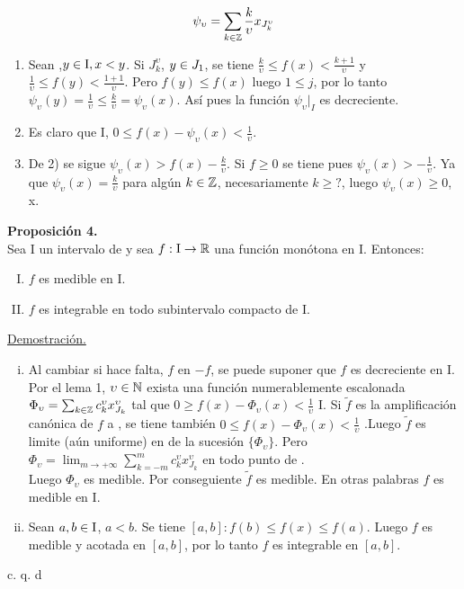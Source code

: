 \begin{equation*}
\psi_\upsilon= \sum_{k \in \mathbb{Z}} \frac{k}{\upsilon} x_{J_k^\upsilon}
\end{equation*}
\begin{enumerate}[1)]
\item Sean \x ,$y \in \mathrm{I}, x < y$. Si \x \en $J_k^\upsilon$, $y \in J_1$, se tiene $\frac{k}{\upsilon} \leq f(x) < \frac{k+1}{\upsilon}$ y $\frac{1}{\upsilon} \leq f(y) < \frac{1+1}{\upsilon}$. Pero $f(y) \leq f(x)$ luego $1 \leq j$, por lo tanto $\psi_\upsilon(y)= \frac{1}{\upsilon} \leq \frac{k}{\upsilon}=\psi_\upsilon (x)$. Así pues la función $\psi_\upsilon |_I$ es decreciente.
\item Es claro que \todo \phantom{} \x \en $\mathrm{I}$, $0 \leq f(x)-\psi_\upsilon (x) < \frac{1}{\upsilon}$.
\item De 2) se sigue $\psi_\upsilon (x) > f(x)-\frac{k}{\upsilon}$. Si $f \geq 0$ se tiene pues $\psi_\upsilon (x) > -\frac{1}{\upsilon}$. Ya que $\psi_\upsilon (x)=\frac{k}{\upsilon}$ para algún $k \in \mathbb{Z}$, necesariamente $k \geq ?$, luego $\psi_\upsilon (x) \geq 0$, \todo x.
\end{enumerate}

\textbf{Proposición 4.} \\
Sea $\mathrm{I}$ un intervalo de \R \phantom{} y sea $f: \mathrm{I} \rightarrow \mathbb{R}$ una función  monótona en $\mathrm{I}$. Entonces:
\begin{enumerate}[I)]

\item $f$ es medible en $\mathrm{I}$.
\item $f$ es integrable en todo subintervalo compacto de $\mathrm{I}$.
\end{enumerate}
\underline{Demostración. }\\
\begin{enumerate}[i)]
\item Al cambiar si hace falta, $f$ en $-f$, se puede suponer que $f$ es decreciente en $\mathrm{I}$. Por el lema 1, \todo \phantom{} $\upsilon \in \mathbb{N}$ exista una función numerablemente escalonada $\Phi_\upsilon =\sum_{k \in \mathbb{Z}}c_k^{\upsilon}x_{J_k}^{\upsilon}$ tal que $0 \geq f(x)- \Phi_\upsilon(x) < \frac{1}{\upsilon}$ \todo \x \en \phantom{} $\mathrm{I}$. Si $\tilde{f}$ es la amplificación canónica de $f$ a \R  , se tiene también $0 \leq f(x)- \Phi_\upsilon(x) < \frac{1}{\upsilon}$ \todo \x \R .Luego $\tilde{f}$ es limite (aún uniforme) en \R \phantom{} de la sucesión $\lbrace \Phi_\upsilon \rbrace$. Pero $\Phi_\upsilon =\lim_{m \to +\infty}\sum_{k=-m}^{m}c_k^{\upsilon}x_{J_k}^{\upsilon}$ en todo punto de \R .\\
Luego $\Phi_\upsilon$ es medible. Por conseguiente $\tilde{f}$ es medible. En otras palabras $f$ es medible en $\mathrm{I}$.

\item Sean $a,b \in \mathrm{I}$, $a<b$. Se tiene \todo \phantom{}\x \en $[a,b]:f(b) \leq f(x) \leq f(a)$. Luego $f$ es medible y acotada en $[a,b]$, por lo tanto $f$ es integrable en $[a,b]$.\\
\end{enumerate}
\hspace{11cm} c. q. d\\

